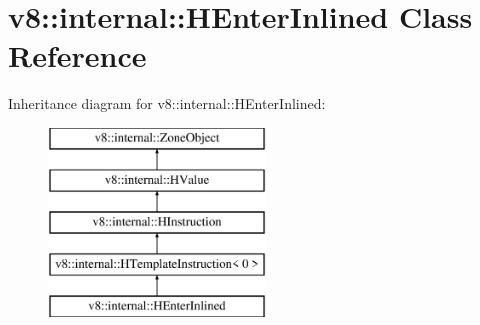 \hypertarget{classv8_1_1internal_1_1_h_enter_inlined}{}\section{v8\+:\+:internal\+:\+:H\+Enter\+Inlined Class Reference}
\label{classv8_1_1internal_1_1_h_enter_inlined}
Inheritance diagram for v8\+:\+:internal\+:\+:H\+Enter\+Inlined\+:\begin{figure}[H]
\begin{center}
\leavevmode
\includegraphics[height=5.000000cm]{classv8_1_1internal_1_1_h_enter_inlined}
\end{center}
\end{figure}
